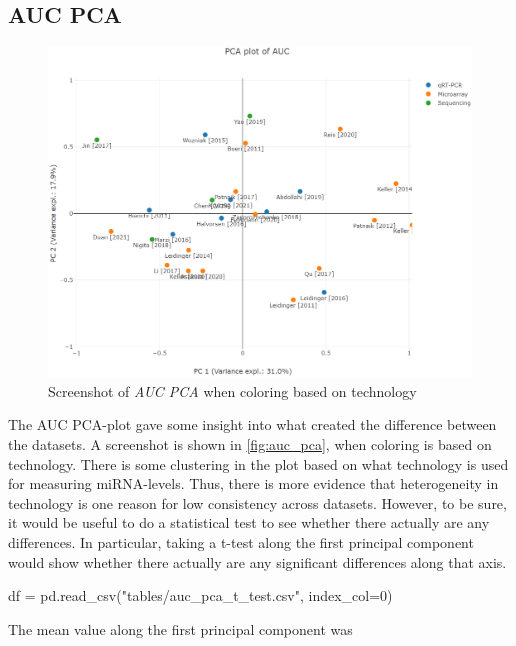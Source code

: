 {{{{{{{{{{{{{{{{{{\subsection{AUC PCA}

\begin{figure}
    \centering
    \includegraphics[width=\textwidth]{figs/webapp_screenshots/auc_pca.png}
    \caption{Screenshot of \textit{AUC PCA} when coloring based on technology}
    \label{fig:auc_pca}
\end{figure}
The AUC PCA-plot gave some insight into what created the difference between the datasets. A screenshot is shown in \autoref{fig:auc_pca}, when coloring is based on technology. There is some clustering in the plot based on what technology is used for measuring miRNA-levels. Thus, there is more evidence that heterogeneity in technology is one reason for low consistency across datasets. However, to be sure, it would be useful to do a statistical test to see whether there actually are any differences. In particular, taking a t-test along the first principal component would show whether there actually are any significant differences along that axis.

\begin{pycode}
df = pd.read_csv("tables/auc_pca_t_test.csv", index_col=0)
\end{pycode}

The mean value along the first principal component was \py{"$%


}}}}}}}}}}}}}}}}}}}

